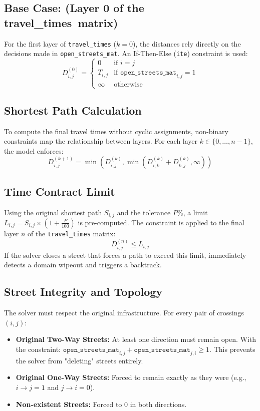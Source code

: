 \subsection*{Base Case: (Layer 0 of the travel\_times\ matrix)}
For the first layer of \texttt{travel\_times} ($k=0$), the distances rely directly on the decisions made in \texttt{open\_streets\_mat}. An If-Then-Else (\texttt{ite}) constraint is used:
\begin{equation}
    D^{(0)}_{i,j} = 
    \begin{cases} 
        0 & \text{if } i = j \\
        T_{i,j} & \text{if } \texttt{open\_streets\_mat}_{i,j} = 1 \\
        \infty & \text{otherwise}
    \end{cases}
\end{equation}

\subsection*{Shortest Path Calculation}
To compute the final travel times without cyclic assignments, non-binary constraints map the relationship between layers. For each layer $k \in \{0, \dots, n-1\}$, the model enforces:
\begin{equation}
    D^{(k+1)}_{i,j} = \min \left( D^{(k)}_{i,j}, \min(D^{(k)}_{i,k} + D^{(k)}_{k,j}, \infty) \right)
\end{equation}

\subsection*{Time Contract Limit}
Using the original shortest path $S_{i,j}$ and the tolerance $P\%$, a limit $L_{i,j} = S_{i,j} \times (1 + \frac{P}{100})$ is pre-computed. The constraint is applied to the final layer $n$ of the \texttt{travel\_times} matrix:
\begin{equation}
    D^{(n)}_{i,j} \le L_{i,j}
\end{equation}
If the solver closes a street that forces a path to exceed this limit, immediately detects a domain wipeout and triggers a backtrack.

\subsection*{Street Integrity and Topology}
The solver must respect the original infrastructure. For every pair of crossings $(i, j)$:
\begin{itemize}
    \item \textbf{Original Two-Way Streets:} At least one direction must remain open. With the constraint: $\texttt{open\_streets\_mat}_{i,j} + \texttt{open\_streets\_mat}_{j,i} \ge 1$. This prevents the solver from "deleting" streets entirely.
    \item \textbf{Original One-Way Streets:} Forced to remain exactly as they were (e.g., $i \to j = 1$ and $j \to i = 0$).
    \item \textbf{Non-existent Streets:} Forced to $0$ in both directions.
\end{itemize}

